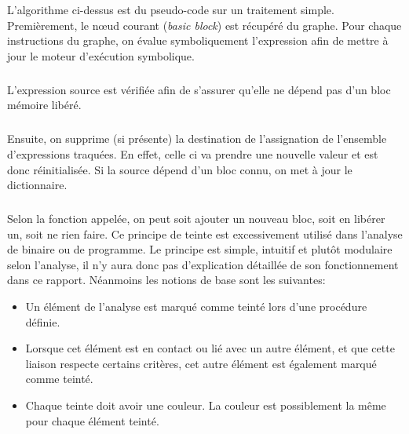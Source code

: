 L'algorithme ci-dessus est du pseudo-code sur un traitement simple.
Premièrement, le nœud courant (\textit{basic block}) est récupéré du graphe. Pour chaque instructions du graphe, on évalue symboliquement
l'expression afin de mettre à jour le moteur d'exécution symbolique.
\subparagraph{}
L'expression source est vérifiée afin de s'assurer qu'elle ne dépend pas d'un bloc mémoire libéré.
\subparagraph{}
Ensuite, on supprime (si présente) la destination de l'assignation de l'ensemble d'expressions traquées. En effet, celle ci va prendre une nouvelle valeur et est donc
réinitialisée. Si la source dépend d'un bloc connu, on met à jour le dictionnaire.
\subparagraph{}
Selon la fonction appelée, on peut soit ajouter un nouveau bloc, soit en libérer un, soit ne rien faire.
Ce principe de teinte est excessivement utilisé dans l'analyse de binaire ou de programme. Le principe est simple, intuitif et plutôt modulaire selon l'analyse, il n'y aura
donc pas d'explication détaillée de son fonctionnement dans ce rapport. Néanmoins les notions de base sont les suivantes:
\begin{itemize}
        \item Un élément de l'analyse est marqué comme teinté lors d'une procédure définie.
        \item Lorsque cet élément est en contact ou lié avec un autre élément, et que cette liaison respecte certains
            critères, cet autre élément est également marqué comme teinté.
        \item Chaque teinte doit avoir une couleur. La couleur est possiblement la même pour chaque élément teinté.
\end{itemize}

